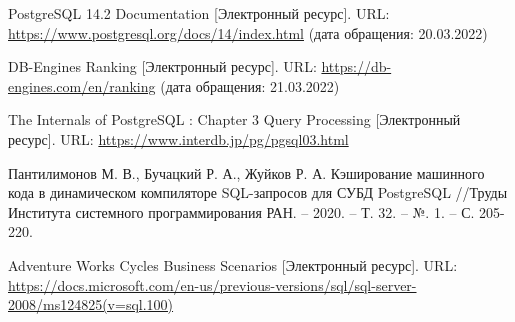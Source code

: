 \renewcommand\bibname{Список литературы}
\begin{thebibliography}{3}
	PostgreSQL 14.2 Documentation [Электронный ресурс]. URL: \newline \url{https://www.postgresql.org/docs/14/index.html} (дата обращения: 20.03.2022)
	
	DB-Engines Ranking [Электронный ресурс]. URL:\newline
	\url{https://db-engines.com/en/ranking}
	(дата обращения: 21.03.2022)
	
	The Internals of PostgreSQL : Chapter 3 Query Processing [Электронный ресурс]. URL: \url{https://www.interdb.jp/pg/pgsql03.html}
	
	Пантилимонов М. В., Бучацкий Р. А., Жуйков Р. А. Кэширование машинного кода в динамическом компиляторе SQL-запросов для СУБД PostgreSQL //Труды Института системного программирования РАН. – 2020. – Т. 32. – №. 1. – С. 205-220.
	
	Adventure Works Cycles Business Scenarios [Электронный ресурс]. URL: \url{https://docs.microsoft.com/en-us/previous-versions/sql/sql-server-2008/ms124825(v=sql.100)}
	
\end{thebibliography}